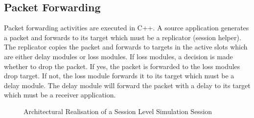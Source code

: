 \subsection{Packet Forwarding}
\label{sec:session-pktforward}
Packet forwarding activities are executed in C++.  A source application 
generates a packet and forwards to its target which must be a replicator 
(session helper).  The replicator copies the packet and forwards 
to targets in the active slots which are either delay modules or loss modules. If loss modules, a decision is made whether to drop the packet.
If yes, the packet is forwarded to the loss modules drop target.  If not,
the loss module forwards it to its target which must be a delay module.
The delay module will forward the packet with a delay to its target which
must be a receiver application.
\begin{figure}[tb]
  \caption{Architectural Realisation of a Session Level Simulation Session}
  \label{fig:session}
\end{figure}

\endinput

### Local Variables:
### mode: latex
### comment-column: 60
### backup-by-copying-when-linked: t
### file-precious-flag: nil
### End:

